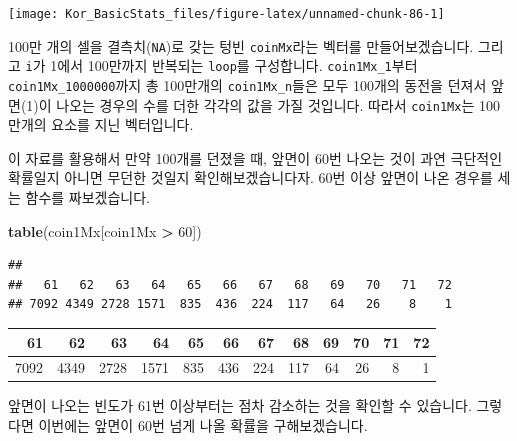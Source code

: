 \documentclass[]{book}
\newenvironment{Shaded}{\begin{snugshade}}{\end{snugshade}}
\newcommand{\DecValTok}[1]{\textcolor[rgb]{0.00,0.00,0.81}{#1}}
\newcommand{\KeywordTok}[1]{\textcolor[rgb]{0.13,0.29,0.53}{\textbf{#1}}}
\newcommand{\NormalTok}[1]{#1}
\newcommand{\OperatorTok}[1]{\textcolor[rgb]{0.81,0.36,0.00}{\textbf{#1}}}
\newcommand{\StringTok}[1]{\textcolor[rgb]{0.31,0.60,0.02}{#1}}
\begin{document}
\begin{center}\texttt{[image: Kor\_BasicStats\_files/figure-latex/unnamed-chunk-86-1]} \end{center}

100만 개의 셀을 결측치(\texttt{NA})로 갖는 텅빈 \texttt{coinMx}라는 벡터를 만들어보겠습니다. 그리고 \texttt{i}가 1에서 100만까지 반복되는 \texttt{loop}를 구성합니다. \texttt{coin1Mx\_1}부터 \texttt{coin1Mx\_1000000}까지 총 100만개의 \texttt{coin1Mx\_n}들은 모두 100개의 동전을 던져서 앞면(1)이 나오는 경우의 수를 더한 각각의 값을 가질 것입니다. 따라서 \texttt{coin1Mx}는 100만개의 요소를 지닌 벡터입니다.

이 자료를 활용해서 만약 100개를 던졌을 때, 앞면이 60번 나오는 것이 과연 극단적인 확률일지 아니면 무던한 것일지 확인해보겠습니다자. 60번 이상 앞면이 나온 경우를 세는 함수를 짜보겠습니다.

\begin{Shaded}
\begin{Highlighting}[]
\KeywordTok{table}\NormalTok{(coin1Mx[coin1Mx }\OperatorTok{>}\StringTok{ }\DecValTok{60}\NormalTok{])}
\end{Highlighting}
\end{Shaded}

\begin{verbatim}
## 
##   61   62   63   64   65   66   67   68   69   70   71   72 
## 7092 4349 2728 1571  835  436  224  117   64   26    8    1
\end{verbatim}

\begin{Shaded}
\end{Shaded}

\begin{tabular}{r|r|r|r|r|r|r|r|r|r|r|r}
\hline
61 & 62 & 63 & 64 & 65 & 66 & 67 & 68 & 69 & 70 & 71 & 72\\
\hline
7092 & 4349 & 2728 & 1571 & 835 & 436 & 224 & 117 & 64 & 26 & 8 & 1\\
\hline
\end{tabular}

앞면이 나오는 빈도가 61번 이상부터는 점차 감소하는 것을 확인할 수 있습니다. 그렇다면 이번에는 앞면이 60번 넘게 나올 확률을 구해보겠습니다.
\end{document}
